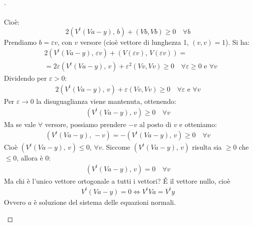 \begin{proof}[\unskip\nopunct]
\begin{itemize}
\[\begin{split}
\end{split} \]
Cioè:
\[
	2(V^t(Va-y), \, b) + (Vb,Vb) \geq 0 \quad \forall b
\]
Prendiamo $b=\varepsilon v$, con $v$ versore (cioè vettore di lunghezza 1, $(v,v)=1$). Si ha:
\[ \begin{split}
	& 2(V^t(Va-y), \, \varepsilon v)+(V(\varepsilon v), \, V(\varepsilon v)) = \\
	& = 2\varepsilon (V^t(Va-y), \, v) + \varepsilon^2(Vv,Vv) \geq 0 \quad \forall \varepsilon \geq 0 \text{ e } \forall v
\end{split} \]
Dividendo per $\varepsilon > 0$:
\[ \begin{split}
	2(V^t(Va-y), \, v) + \varepsilon(Vv,Vv) \geq 0 \quad \forall \varepsilon \text{ e } \forall v
\end{split} \]
Per $\varepsilon \to 0$ la disuguaglianza viene mantenuta, ottenendo:
\[ \begin{split}
	(V^t(Va-y), \, v) \geq 0 \quad \forall v
\end{split} \]
Ma se vale $\forall$ versore, possiamo prendere $-v$ al posto di $v$ e otteniamo:
\[ \begin{split}
	(V^t(Va-y), \, -v)=-(V^t(Va-y), \, v) \geq 0 \quad \forall v
\end{split} \]
Cioè $(V^t(Va-y), \, v) \leq 0$, $\forall v$. Siccome $(V^t(Va-y), \, v)$ risulta sia $\geq 0$ che $\leq 0$, allora è $0$:
\[ \begin{split}
	(V^t(Va-y), \, v)=0 \quad \forall v
\end{split} \]
Ma chi è l'unico vettore ortogonale a tutti i vettori? \'E il vettore nullo, cioè
\[ \begin{split}
	V^t(Va-y)=0 \iff V^tVa=V^ty
\end{split} \]
Ovvero $a$ è soluzione del sistema delle equazioni normali.
\end{itemize}
\end{proof}

